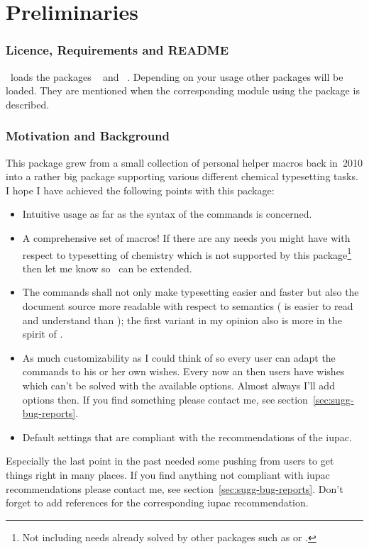 \documentclass[load-preamble+]{cnltx-doc}
\begin{document}
\part{Preliminaries}
\section{Licence, Requirements and \textsc{README}}\label{sec:licence-requ-readme}
\license

\chemmacros\ loads the packages ~\cite{bnd:l3kernel} and
~\cite{bnd:l3packages}.  Depending on your usage other packages
will be loaded.  They are mentioned when the corresponding module using the
package is described.

\section{Motivation and Background}\label{sec:motiv-backgr}
This package grew from a small collection of personal helper macros back
in~2010 into a rather big package supporting various different chemical
typesetting tasks.  I hope I have achieved the following points with this
package:
\begin{itemize}
  \item Intuitive usage as far as the syntax of the commands is concerned.
  \item A comprehensive set of macros! If there are any needs you might have
    with respect to typesetting of chemistry which is not supported by this
    package\footnote{Not including needs already solved by other packages such
      as  or .} then let me know so \chemmacros\ can
    be extended.
  \item The commands shall not only make typesetting easier and faster but
    also the document source more readable with respect to semantics
    ( is easier to read and understand than
    ); the first variant in my
    opinion also is more in the spirit of \LaTeXe.
  \item As much customizability as I could think of so every user can adapt
    the commands to his or her own wishes.  Every now an then users have
    wishes which can't be solved with the available options.  Almost always
    I'll add options then.  If you find something please contact me, see
    section~\vref{sec:sugg-bug-reports}.
  \item Default settings that are compliant with the recommendations of the
    \acf{iupac}.
\end{itemize}
Especially the last point in the past needed some pushing from users to get
things right in many places.  If you find anything not compliant with
\ac{iupac} recommendations please contact me, see
section~\vref{sec:sugg-bug-reports}.  Don't forget to add references for the
corresponding \ac{iupac} recommendation.
\end{document}
